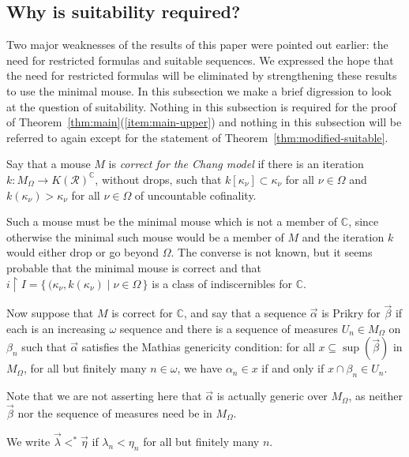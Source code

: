 \documentclass[
twoside,
]{article}
\theoremstyle{definition}
\theoremstyle{remark}
\newcommand{\ords}{\Omega}
\newcommand\reals{\mathcal{R}}
\newcommand{\RK}{K(\reals)}
\newcommand{\set}[1]{\{\,#1\,\}}
\newcommand{\restrict}{{\upharpoonright}}
\newcommand\chang{\mathbb{C}}
\begin{document}
\subsection{Why is suitability required?}
\label{sec:suitability-required}
Two major weaknesses of the results of this
paper were pointed out earlier:  the need for restricted formulas and suitable sequences.   We expressed the hope that the need for restricted
formulas will be eliminated by strengthening these results to use
the minimal mouse.   In this subsection we make a brief digression to
look at the question of suitability.   Nothing in this subsection is
required for the proof of
Theorem~\ref{thm:main}(\ref{item:main-upper}) and nothing in this
subsection will be referred to again except for the statement of
Theorem~\ref{thm:modified-suitable}.

Say that a mouse $M$ is \emph{correct for the Chang model} if there is
an iteration $k\colon M_{\ords}\to\RK^{\chang}$, without drops, such
that $k[\kappa_{\nu}]\subset\kappa_{\nu}$ for all $\nu\in\ords$ and
$k(\kappa_\nu)>\kappa_\nu$ for all $\nu\in\ords$ of uncountable
cofinality.

Such a mouse must be the minimal mouse which is not a member of  $\chang$, since
otherwise the minimal such mouse would be a member of $M$ and the
iteration $k$ would either drop or go beyond $\ords$.  The converse is
not known, but it seems probable that the minimal mouse is correct and that $i\restrict
I=\set{(\kappa_\nu,k(\kappa_\nu)\mid\nu\in\ords}  $ is a 
class of indiscernibles for $\chang$.

Now suppose that $M$ is correct for $\chang$, and  
say that a sequence $\vec\alpha$ is Prikry for $\vec \beta$ if each is an
increasing $\omega$ sequence and there is a sequence of measures $U_n\in M_{\ords}$ on
$\beta_n$  such that $\vec\alpha$ satisfies the Mathias genericity
condition: for all $x\subseteq\sup(\vec\beta)$
in $M_{\ords}$, 
for all but finitely many  $n\in\omega$, we have $\alpha_n\in x$ if and
only if $x\cap\beta_n\in U_n$.

Note that we are not asserting here that $\vec\alpha$ is actually generic
over $M_{\ords}$, as neither $\vec\beta$ nor the sequence of measures
need be in $M_\ords$.

We write $\vec\lambda<^*\vec \eta$ if $\lambda_n<\eta_n$ for all but
finitely many $n$.
\end{document}
